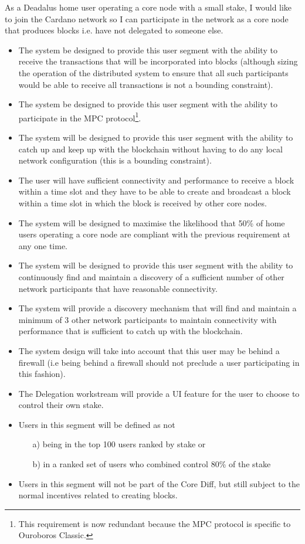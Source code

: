 \documentclass{report}
\theoremstyle{definition}{
  \newtheorem{lemma}{Lemma}[section] %
  \newtheorem{definition}[lemma]{Definition}
}
\theoremstyle{theorem}{
  \newtheorem{invariant}[lemma]{Invariant}
  \newtheorem{proofobligation}[lemma]{Proof Obligation}
}
\numberwithin{equation}{lemma}
\begin{document}
As a Deadalus home user operating a core node with a small stake, I would like
to join the Cardano network so I can participate in the network as a core node
that produces blocks i.e. have not delegated to someone else.

\begin{itemize}
\item The system be designed to provide this user segment with the ability to
      receive the transactions that will be incorporated into blocks (although
      sizing the operation of the distributed system to ensure that all such
      participants would be able to receive all transactions is not a bounding
      constraint).
\item The system be designed to provide this user segment with the ability to
      participate in the MPC protocol\footnote{This requirement is now
      redundant because the MPC protocol is specific to Ouroboros Classic.}.
\item The system will be designed to provide this user segment with the ability
      to catch up and keep up with the blockchain without having to do any local
      network configuration (this is a bounding constraint).
\item The user will have sufficient connectivity and performance to receive a
      block within a time slot {\sc and} they have to be able to create and
      broadcast a block within a time slot in which the block is received by
      other core nodes.
\item The system will be designed to maximise the likelihood that 50\% of home
      users operating a core node are compliant with the previous requirement
      at any one time.
\item The system will be designed to provide this user segment with the ability
      to continuously find and maintain a discovery of a sufficient number of
      other network participants that have reasonable connectivity.
\item The system will provide a discovery mechanism that will find and maintain
      a minimum of 3 other network participants to maintain connectivity with
      performance that is sufficient to catch up with the blockchain.
\item The system design will take into account that this user may be behind a
      firewall (i.e being behind a firewall should not preclude a user
      participating in this fashion).
\item The Delegation workstream will provide a UI feature for the user to
      choose to control their own stake.
\item Users in this segment will be defined as {\sc not}
      \begin{itemize}
      \item[a)] being in the top 100 users ranked by stake or
      \item[b)] in a ranked set of users who combined control 80\% of the stake
      \end{itemize}
\item Users in this segment will not be part of the Core Diff, but still
      subject to the normal incentives related to creating blocks.
\end{itemize}
\end{document}
